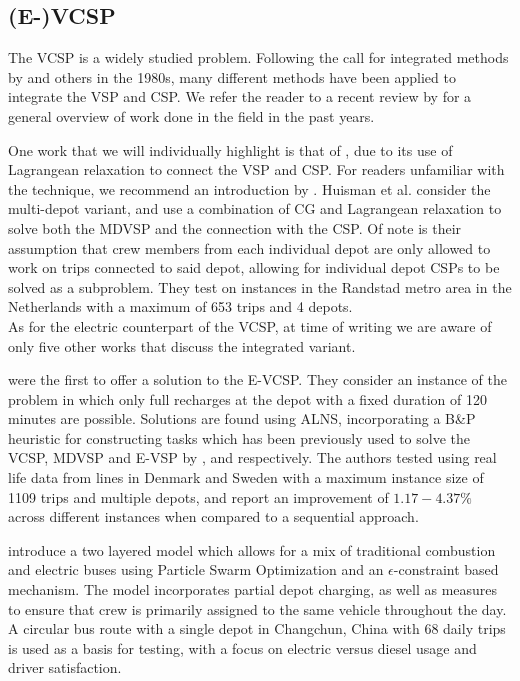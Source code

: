 \documentclass[]{article}
\begin{document}
\subsection{(E-)VCSP} \label{sec:evcsp-litrev}
The VCSP is a widely studied problem. Following the call for integrated methods by \citet{Bodin1983} and others in the 1980s, many different methods have been applied to integrate the VSP and CSP. We refer the reader to a recent review by \citet{Ge2024} for a general overview of work done in the field in the past years.

One work that we will individually highlight is that of \citet{Huisman2005}, due to its use of Lagrangean relaxation to connect the VSP and CSP. For readers unfamiliar with the technique, we recommend an introduction by \citet{Beasley1993}. Huisman et al. consider the multi-depot variant, and use a combination of CG and Lagrangean relaxation to solve both the MDVSP and the connection with the CSP. Of note is their assumption that crew members from each individual depot are only allowed to work on trips connected to said depot, allowing for individual depot CSPs to be solved as a subproblem. They test on instances in the Randstad metro area in the Netherlands with a maximum of 653 trips and 4 depots. \\

As for the electric counterpart of the VCSP, at time of writing we are aware of only five other works that discuss the integrated variant.

\citet{Perumal2021} were the first to offer a solution to the E-VCSP. They consider an instance of the problem in which only full recharges at the depot with a fixed duration of 120 minutes are possible. Solutions are found using ALNS, incorporating a B\&P heuristic for constructing tasks which has been previously used to solve the VCSP, MDVSP and E-VSP by \citet{Haase1996}, \citet{Pepin2009} and
\citet{ vanKootenNiekerk2017} respectively. The authors tested using real life data from lines in Denmark and Sweden with a
maximum instance size of 1109 trips and multiple depots, and report an improvement of $1.17-4.37\%$
across different instances when compared to a sequential approach.

\citet{Wang2022} introduce a two layered model which allows for a mix of traditional combustion and electric buses using Particle Swarm Optimization and an $\epsilon$-constraint based mechanism. The model incorporates partial depot charging, as well as measures to ensure that crew is primarily assigned to the same vehicle throughout the day. A circular bus route with a single depot in Changchun, China with 68 daily trips is used as a basis for testing, with a focus on electric versus diesel usage and driver satisfaction.
\end{document}
